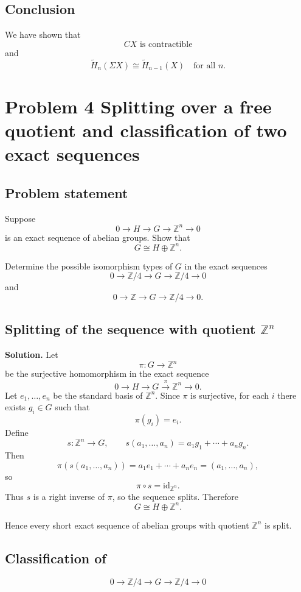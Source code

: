 \documentclass[12pt,a4paper]{article}
\theoremstyle{notespace}
\begin{document}
\subsection{Conclusion}

We have shown that
\[
CX \text{ is contractible}
\]
and
\[
\boxed{\widetilde H_n(\Sigma X)\cong \widetilde H_{n-1}(X)\quad \text{for all } n.}
\]

\section{Problem 4 Splitting over a free quotient and classification of two exact sequences}

\subsection{Problem statement}

Suppose
\[
0\longrightarrow H \longrightarrow G \longrightarrow \mathbb Z^n \longrightarrow 0
\]
is an exact sequence of abelian groups. Show that
\[
G\cong H\oplus \mathbb Z^n.
\]

Determine the possible isomorphism types of \(G\) in the exact sequences
\[
0\longrightarrow \mathbb Z/4 \longrightarrow G \longrightarrow \mathbb Z/4 \longrightarrow 0
\]
and
\[
0\longrightarrow \mathbb Z \longrightarrow G \longrightarrow \mathbb Z/4 \longrightarrow 0.
\]

\subsection{Splitting of the sequence with quotient \(\mathbb Z^n\)}

\noindent\textbf{Solution.}
Let
\[
\pi:G\to \mathbb Z^n
\]
be the surjective homomorphism in the exact sequence
\[
0\to H\to G\overset{\pi}{\to}\mathbb Z^n\to 0.
\]
Let \(e_1,\dots,e_n\) be the standard basis of \(\mathbb Z^n\). Since \(\pi\) is surjective, for each \(i\) there exists \(g_i\in G\) such that
\[
\pi(g_i)=e_i.
\]
Define
\[
s:\mathbb Z^n\to G,
\qquad
s(a_1,\dots,a_n)=a_1g_1+\cdots+a_ng_n.
\]
Then
\[
\pi(s(a_1,\dots,a_n))
=
a_1e_1+\cdots+a_ne_n
=
(a_1,\dots,a_n),
\]
so
\[
\pi\circ s=\mathrm{id}_{\mathbb Z^n}.
\]
Thus \(s\) is a right inverse of \(\pi\), so the sequence splits. Therefore
\[
G\cong H\oplus \mathbb Z^n.
\]

Hence every short exact sequence of abelian groups with quotient \(\mathbb Z^n\) is split.

\subsection{Classification of}
\[
0\longrightarrow \mathbb Z/4 \longrightarrow G \longrightarrow \mathbb Z/4 \longrightarrow 0
\]
\end{document}
